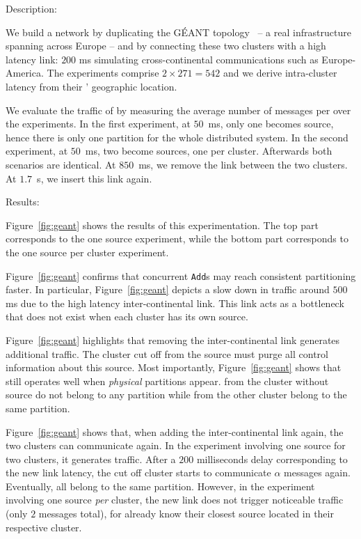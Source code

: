 \begin{asparadesc}
\item [Description:]

We build a network by duplicating the G{\'E}ANT
topology~\cite{knight2011internet} -- a real infrastructure spanning
across Europe -- and by connecting these two clusters with a high
latency link: $200$ ms simulating cross-continental communications
such as Europe-America. The experiments comprise $2 \times 271 = 542$
\processes and we derive intra-cluster latency from their \processes'
geographic location.

\noindent We evaluate the traffic of \NAME by measuring the average
number of messages per \process over the experiments. In the first
experiment, at $50$~ms, only one \process becomes source, hence there
is only one partition for the whole distributed system. In the second
experiment, at $50$~ms, two \processes become sources, one per
cluster. Afterwards both scenarios are identical. At $850$~ms, we
remove the link between the two clusters. At $1.7$~s, we insert this
link again.

\item [Results:]

Figure~\ref{fig:geant} shows the results of this experimentation. The
top part corresponds to the one source experiment, while the bottom
part corresponds to the one source per cluster experiment.

\noindent Figure~\ref{fig:geant} confirms that concurrent
\texttt{Add}s may reach consistent partitioning faster. In particular,
Figure~\ref{fig:geant} depicts a slow down in traffic around $500$ ms
due to the high latency inter-continental link. This link acts as a
bottleneck that does not exist when each cluster has its own source.

\noindent Figure~\ref{fig:geant} highlights that removing the
inter-continental link generates additional traffic. The cluster cut
off from the source must purge all control information about this
source.  Most importantly, Figure~\ref{fig:geant} shows that \NAME
still operates well when \emph{physical} partitions appear. \Processes
from the cluster without source do not belong to any partition while
\processes from the other cluster belong to the same partition. 

\noindent Figure~\ref{fig:geant} shows that, when adding the
inter-continental link again, the two clusters can communicate
again. In the experiment involving one source for two clusters, it
generates traffic. After a $200$ milliseconds delay corresponding to
the new link latency, the cut off cluster starts to communicate
$\alpha$ messages again. Eventually, all \processes belong to the same
partition. However, in the experiment involving one source \emph{per}
cluster, the new link does not trigger noticeable traffic (only $2$
messages total), for \processes already know their closest source
located in their respective cluster.


\end{asparadesc}
